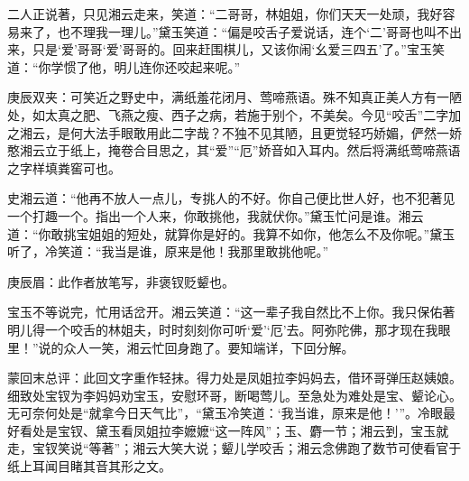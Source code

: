 \begin{parag}
    二人正说著，只见湘云走来，笑道：“二哥哥，林姐姐，你们天天一处顽，我好容易来了，也不理我一理儿。”黛玉笑道：“偏是咬舌子爱说话，连个‘二’哥哥也叫不出来，只是‘爱’哥哥‘爱’哥哥的。回来赶围棋儿，又该你闹‘幺爱三四五’了。”宝玉笑道：“你学惯了他，明儿连你还咬起来呢。”\begin{note}庚辰双夹：可笑近之野史中，满纸羞花闭月、莺啼燕语。殊不知真正美人方有一陋处，如太真之肥、飞燕之瘦、西子之病，若施于别个，不美矣。今见“咬舌”二字加之湘云，是何大法手眼敢用此二字哉？不独不见其陋，且更觉轻巧娇媚，俨然一娇憨湘云立于纸上，掩卷合目思之，其“爱”“厄”娇音如入耳内。然后将满纸莺啼燕语之字样填粪窖可也。\end{note}史湘云道：“他再不放人一点儿，专挑人的不好。你自己便比世人好，也不犯著见一个打趣一个。指出一个人来，你敢挑他，我就伏你。”黛玉忙问是谁。湘云道：“你敢挑宝姐姐的短处，就算你是好的。我算不如你，他怎么不及你呢。”黛玉听了，冷笑道：“我当是谁，原来是他！我那里敢挑他呢。”\begin{note}庚辰眉：此作者放笔写，非褒钗贬颦也。\end{note}宝玉不等说完，忙用话岔开。湘云笑道：“这一辈子我自然比不上你。我只保佑著明儿得一个咬舌的林姐夫，时时刻刻你可听‘爱’‘厄’去。阿弥陀佛，那才现在我眼里！”说的众人一笑，湘云忙回身跑了。要知端详，下回分解。
\end{parag}


\begin{parag}
    \begin{note}蒙回末总评：此回文字重作轻抹。得力处是凤姐拉李妈妈去，借环哥弹压赵姨娘。细致处宝钗为李妈妈劝宝玉，安慰环哥，断喝莺儿。至急处为难处是宝、颦论心。无可奈何处是“就拿今日天气比”，“黛玉冷笑道：‘我当谁，原来是他！’”。冷眼最好看处是宝钗、黛玉看凤姐拉李嬷嬷“这一阵风”；玉、麝一节；湘云到，宝玉就走，宝钗笑说“等著”；湘云大笑大说；颦儿学咬舌；湘云念佛跑了数节可使看官于纸上耳闻目睹其音其形之文。\end{note}
\end{parag}